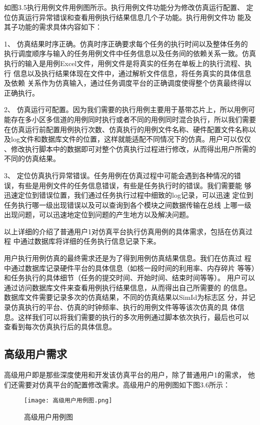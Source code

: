 如图3.5执行用例文件用例图所示。执行用例文件功能分为修改仿真运行配置、
定位仿真运行异常错误和查看用例执行结果信息几个子功能。执行用例文件功
能及其子功能的需求具体内容如下：

1、	仿真结果时序正确。仿真时序正确要求每个任务的执行时间以及整体任务的
执行调度顺序与输入的任务用例文件中任务信息以及任务间的依赖关系一致。仿真
执行的输入是用例Excel文件，用例文件是将真实的任务在单板上的执行流程、执行
信息以及执行结果体现在文件中，通过解析文件信息，将任务真实的具体信息及依赖
关系作为仿真输入，通过任务调度平台的正确调度使得整个仿真最终得以正确执行。

2、	仿真运行可配置。因为我们需要的执行用例主要用于基带芯片上，所以用例可
能存在多小区多信道的用例同时执行或者不同的用例同时混合执行，所以我们需要
在仿真运行前配置用例执行次数、仿真执行的用例文件名称、硬件配置文件名称以
及log文件和数据库文件的位置，这样就能适配不同情况下的仿真。用户可以仅仅
、修改执行脚本中的数据即可对整个仿真执行过程进行修改，从而得出用户所需的
不同的仿真结果。

3、	定位仿真执行异常错误。任务用例在仿真过程中可能会遇到各种情况的错
误，有些是用例文件的任务信息错误，有些是任务执行时的错误。我们需要能
够迅速定位到错误位置，我们通过任务执行过程中细致的log记录，可以迅速
定位到任务执行哪一级出现错误以及可以查询到各个模块之间数据传输在总线
上哪一级出现问题，可以迅速地定位到问题的产生地方以及解决问题。

以上详细的介绍了普通用户1对仿真平台执行仿真用例的具体需求，包括在仿真过程
中通过数据库将详细的任务执行信息记录下来。

用户执行用例仿真的最终需求还是为了得到用例仿真结果信息。我们在仿真过
程中通过数据库记录硬件平台的具体信息（如核一段时间的利用率、内存碎片
等等）和任务执行的具体细节（任务的提交时间、开始时间、结束时间等等）。
用户可以通过访问数据库文件来查看用例执行结果信息，从而得出自己所需要的
的信息。数据库文件需要记录多次的仿真结果，不同的仿真结果以SimId为标志区
分，并记录仿真执行的平台、仿真的时钟频率、执行的用例文件等等该次仿真的具
体信息。这样我们可以将我们需要的执行的多次用例通过脚本依次执行，最后也可以
查看到每次仿真执行后的具体信息。

\subsection{高级用户需求}
高级用户即是那些深度使用和开发该仿真平台的用户，除了普通用户1的需求，
他们还需要对仿真平台的配置修改需求。高级用户的用例图如下图3.6所示：

\begin{figure}[h]
    \centering
    \texttt{[image: 高级用户用例图.png]}
    \caption{高级用户用例图}
    \label{fig:badge}
\end{figure}

